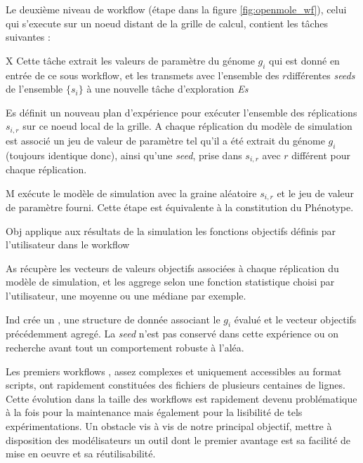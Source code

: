 Le deuxième niveau de workflow (étape  dans la figure \ref{fig:openmole_wf}), celui qui s'execute sur un noeud distant de la grille de calcul, contient les tâches suivantes :

\begin{myitemize}

\item[X] Cette tâche extrait les valeurs de paramètre du génome $g_i$ qui est donné en entrée de ce sous workflow, et les transmets avec l'ensemble des $r$différentes \textit{seeds} de l'ensemble $\{s_i\}$ à une nouvelle tâche d'exploration \textit{Es}

\item[Es] définit un nouveau plan d'expérience pour exécuter l'ensemble des réplications $s_{i,r}$ sur ce noeud local de la grille. A chaque réplication du modèle de simulation est associé un jeu de valeur de paramètre tel qu'il a été extrait du génome $g_i$ (toujours identique donc), ainsi qu'une \textit{seed}, prise dans $s_{i,r}$ avec $r$ différent pour chaque réplication.

\item[M] exécute le modèle de simulation avec la graine aléatoire $s_{i,r}$ et le jeu de valeur de paramètre fourni. Cette étape est équivalente à la constitution du Phénotype.

\item[Obj] applique aux résultats de la simulation les fonctions objectifs définis par l'utilisateur dans le workflow

\item[As] récupère les vecteurs de valeurs objectifs associées à chaque réplication du modèle de simulation, et les aggrege selon une fonction statistique choisi par l'utilisateur, une moyenne ou une médiane par exemple.

\item[Ind] crée un , une structure de donnée associant le  $g_i$ évalué et le vecteur objectifs précédemment agregé. La \textit{seed} n'est pas conservé dans cette expérience ou on recherche avant tout un comportement robuste à l'aléa.

\end{myitemize}

Les premiers workflows , assez complexes et uniquement accessibles au format scripts, ont rapidement constituées des fichiers de plusieurs centaines de lignes. Cette évolution dans la taille des workflows est rapidement devenu problématique à la fois pour la maintenance mais également pour la lisibilité de tels expérimentations. Un obstacle vis à vis de notre principal objectif, mettre à disposition des modélisateurs un outil dont le premier avantage est sa facilité de mise en oeuvre et sa réutilisabilité.

